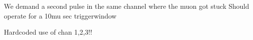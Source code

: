 \documentclass[letterpaper,10pt,english]{sphinxmanual}
\begin{document}
\begin{fulllineitems}
\label{muonic:muonic.analysis.PulseAnalyzer.DecayTriggerThorough}
We demand a second pulse in the same channel where the muon got stuck
Should operate for a 10mu sec triggerwindow

\begin{fulllineitems}
\label{muonic:muonic.analysis.PulseAnalyzer.DecayTriggerThorough.trigger}
Hardcoded use of chan 1,2,3!!

\end{fulllineitems}


\end{fulllineitems}

\end{document}

